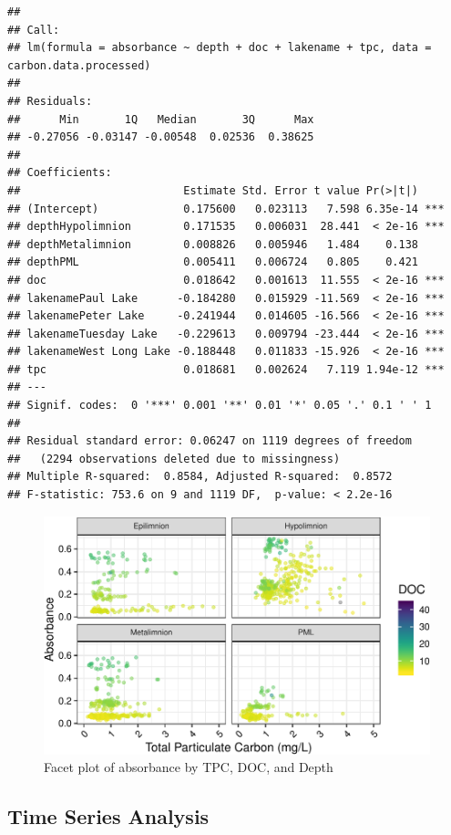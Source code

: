 \documentclass[12pt,]{article}
\begin{document}
\begin{verbatim}
## 
## Call:
## lm(formula = absorbance ~ depth + doc + lakename + tpc, data = carbon.data.processed)
## 
## Residuals:
##      Min       1Q   Median       3Q      Max 
## -0.27056 -0.03147 -0.00548  0.02536  0.38625 
## 
## Coefficients:
##                         Estimate Std. Error t value Pr(>|t|)    
## (Intercept)             0.175600   0.023113   7.598 6.35e-14 ***
## depthHypolimnion        0.171535   0.006031  28.441  < 2e-16 ***
## depthMetalimnion        0.008826   0.005946   1.484    0.138    
## depthPML                0.005411   0.006724   0.805    0.421    
## doc                     0.018642   0.001613  11.555  < 2e-16 ***
## lakenamePaul Lake      -0.184280   0.015929 -11.569  < 2e-16 ***
## lakenamePeter Lake     -0.241944   0.014605 -16.566  < 2e-16 ***
## lakenameTuesday Lake   -0.229613   0.009794 -23.444  < 2e-16 ***
## lakenameWest Long Lake -0.188448   0.011833 -15.926  < 2e-16 ***
## tpc                     0.018681   0.002624   7.119 1.94e-12 ***
## ---
## Signif. codes:  0 '***' 0.001 '**' 0.01 '*' 0.05 '.' 0.1 ' ' 1
## 
## Residual standard error: 0.06247 on 1119 degrees of freedom
##   (2294 observations deleted due to missingness)
## Multiple R-squared:  0.8584, Adjusted R-squared:  0.8572 
## F-statistic: 753.6 on 9 and 1119 DF,  p-value: < 2.2e-16
\end{verbatim}

\begin{figure}
\centering
\includegraphics{Bash_ENV872_Project_files/figure-latex/lin-1.pdf}
\caption{\label{fig:lin}Facet plot of absorbance by TPC, DOC, and Depth}
\end{figure}

\newpage

\subsection{Time Series Analysis}\label{time-series-analysis}
\end{document}
